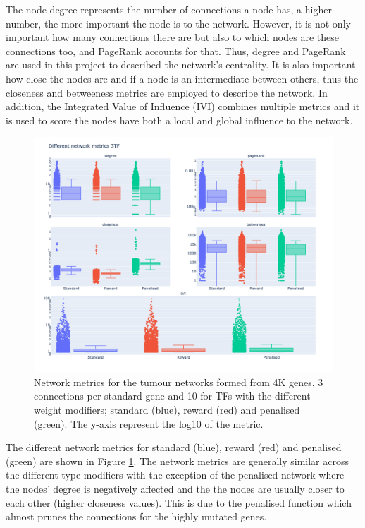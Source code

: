 The node degree represents the number of connections a node has, a higher number, the more important the node is to the network. However, it is not only important how many connections there are but also to which nodes are these connections too, and PageRank\cite{Brin1998-mc} accounts for that. Thus, degree and PageRank are used in this project to described the network's centrality. It is also important how close the nodes are and if a node is an intermediate between others, thus the closeness and betweeness metrics are employed to describe the network. In addition, the Integrated Value of Influence (IVI) \cite{Salavaty2020-wo} combines multiple metrics and it is used to score the nodes have both a local and global influence to the network.

\begin{figure}[!htb]    \centering\includegraphics[width=1.0\textwidth,height=0.7\textheight,keepaspectratio]{Sections/Network_I/Resources/Tum_network/NetworkMetricsComp_10TF.png}
    \caption{Network metrics for the tumour networks formed from 4K genes, 3 connections per standard gene and 10 for TFs with the different weight modifiers; standard (blue), reward (red) and penalised (green). The y-axis represent the log10 of the metric. }
    \label{fig:N_I:net_metrics_tum}
\end{figure}

The different network metrics for standard (blue), reward (red) and penalised (green) are shown in Figure \ref{fig:N_I:net_metrics_tum}. The network metrics are generally similar across the different type modifiers with the exception of the penalised network where the nodes' degree is negatively affected and the the nodes are usually closer to each other (higher closeness values). This is due to the penalised function which almost prunes the connections for the highly mutated genes.

